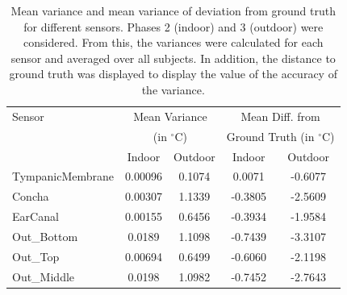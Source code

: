 \begin{table}[ht]
\centering
\begin{tabular}{|l|c|c|c|c|}
\hline
Sensor & \multicolumn{2}{c|}{Mean Variance} & \multicolumn{2}{c|}{Mean Diff. from} \\
       & \multicolumn{2}{c|}{(in $^\circ\text{C}$)} & \multicolumn{2}{c|}{Ground Truth (in $^\circ\text{C}$)} \\
\hline
 & Indoor & Outdoor & Indoor & Outdoor \\
\hline
TympanicMembrane & 0.00096 & 0.1074 & 0.0071 & -0.6077 \\
Concha & 0.00307 & 1.1339 & -0.3805 & -2.5609 \\
EarCanal & 0.00155 & 0.6456 & -0.3934 & -1.9584 \\
Out\_Bottom & 0.0189 & 1.1098 & -0.7439 & -3.3107 \\
Out\_Top & 0.00694 & 0.6499 & -0.6060 & -2.1198 \\
Out\_Middle & 0.0198 & 1.0982 & -0.7452 & -2.7643 \\
\hline
\end{tabular}
\caption{Mean variance and mean variance of deviation from ground truth for different sensors. Phases 2 (indoor) and 3 (outdoor) were considered. From this, the variances were calculated for each sensor and averaged over all subjects. In addition, the distance to ground truth was displayed to display the value of the accuracy of the variance.}
\label{subsec:Evaluation:Study2:Hypothesis2:mean_variance_table}
\end{table}

